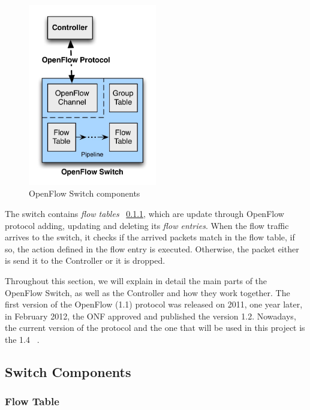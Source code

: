 \begin{figure}[htb]
\centering
\includegraphics[width=0.5\textwidth]{./images/OpenFlowSwitch.jpg}
\caption{OpenFlow Switch components} \label{fig:OpenFlowSwitch}
\end{figure}

\par 

The switch contains \textit{flow tables} ~\ref{subsec:SCFlowTable}, which are update through OpenFlow protocol adding, updating and deleting its \textit{flow entries}. When the flow traffic arrives to the switch, it checks if the arrived packets match in the flow table, if so, the action defined in the flow entry is executed. Otherwise, the packet either is send it to the Controller or it is dropped.

\bigskip

Throughout this section, we will explain in detail the main parts of the OpenFlow Switch, as well as the Controller and how they work together. The first version of the OpenFlow (1.1) protocol was released on 2011, one year later, in February 2012, the ONF approved and published the version 1.2. Nowadays, the current version of the protocol and the one that will be used in this project is the 1.4 ~\cite{OpenFlowSpecification}.

\subsection{Switch Components}
\label{subsec:PFSwitchComponents}

\subsubsection{Flow Table}
\label{subsec:SCFlowTable}

